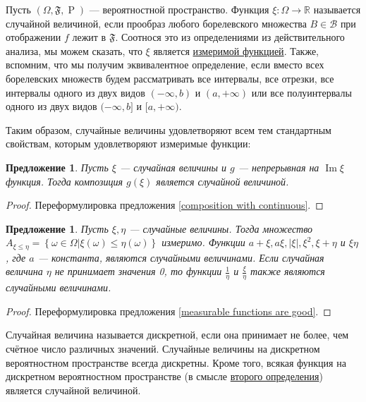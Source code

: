 \documentclass[12pt]{article}
\newtheorem{proposition}[theorem]{Предложение}
\numberwithin{theorem}{section}
\theoremstyle{definition}
\newcommand{\RR}{\mathbb{R}}
\newcommand{\calB}{\mathcal{B}}
\newcommand{\prob}{\operatorname{P}}
\newcommand{\defin}[2]{\hypertarget{#2}{{\color{red} #1}}}
\newcommand{\events}{\mathfrak{F}}
\newcommand{\Image}{\operatorname{Im}}
\newcommand{\defineset}[2]{\left\{
	\left.
	#1
	\right\vert
	#2
	\right\}}
\begin{document}
	Пусть $ (\Omega, \events, \prob) $ --- вероятностной пространство.
	Функция $ \xi \colon \Omega \to \RR $ называется \defin{случайной величиной}{random-variable},
	если прообраз любого борелевского множества $ B \in \calB $ при отображении $ f $
	лежит в $ \events $. Соотнося это из определениями из действительного анализа, 
	мы можем сказать, что $ \xi $ является \hyperlink{measurable-function}{измеримой функцией}.
	Также, вспомним, что мы получим эквивалентное определение,
	если вместо всех борелевских множеств будем рассматривать все интервалы, все отрезки,
	все интервалы одного из двух видов $ (-\infty, b) $ и $ (a, +\infty) $
	или все полуинтервалы одного из двух видов $ (-\infty, b] $ и $ [a, +\infty) $.
	
	Таким образом, случайные величины удовлетворяют всем тем стандартным свойствам, 
	которым удовлетворяют измеримые функции:
	
	\begin{proposition} \label{random variebles composition with continuous}
		Пусть $ \xi $ --- случайная величины и $ g $ --- непрерывная на $ \Image \xi $ функция.
		Тогда композиция $ g(\xi) $ является случайной величиной.
	\end{proposition}
	
	\begin{proof}
		Переформулировка предложения \ref{composition with continuous}.
	\end{proof}
	
	\begin{proposition} \label{random variables are good}
		Пусть $ \xi, \eta $ --- случайные величины.
		Тогда множество $ A_{\xi \leqslant \eta} = \defineset{\omega \in \Omega}{\xi(\omega) \leqslant \eta(\omega)} $
		измеримо.
		Функции $ a + \xi, a\xi, |\xi|, \xi^2, \xi + \eta $ и $ \xi\eta $, где $ a $ --- константа, являются случайными величинами.
		Если случайная величина $ \eta $ не принимает значения 0, то функции $ \tfrac{1}{\eta} $ и $ \tfrac{\xi}{\eta} $
		также являются случайными величинами.
	\end{proposition}
	
	\begin{proof}
		Переформулировка предложения \ref{measurable functions are good}.
	\end{proof}
	
	Случайная величина называется \defin{дискретной}{discrete-random-variable}, 
	если она принимает не более, чем счётное число различных значений.
	Случайные величины на дискретном вероятностном пространстве всегда дискретны.
	Кроме того, всякая функция на дискретном вероятностном пространстве (в смысле \hyperlink{discr-2}{второго определения})
	является случайной величиной.
	
\end{document}
